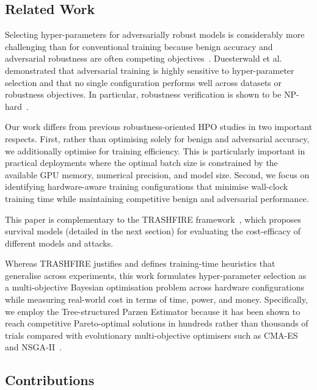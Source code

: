 \documentclass[conference]{IEEEtran}%
\begin{document}
\subsection{Related Work}

Selecting hyper-parameters for adversarially robust models is considerably more challenging than for conventional training because benign accuracy and adversarial robustness are often competing objectives~\cite{carlini_towards_2017,meyers,dohmatob_generalized_2019}. 
Duesterwald et al.~\cite{duesterwald2019} demonstrated that adversarial training is highly sensitive to hyper-parameter selection and that no single configuration performs well across datasets or robustness objectives. 
In particular, robustness verification is shown to be NP-hard~\cite{carlini_towards_2017}.

Our work differs from previous robustness-oriented HPO studies in two important respects. 
First, rather than optimising solely for benign and adversarial accuracy, we additionally optimise for training efficiency. 
This is particularly important in practical deployments where the optimal batch size is constrained by the available GPU memory, numerical precision, and model size. 
Second, we focus on identifying hardware-aware training configurations that minimise wall-clock training time while maintaining competitive benign and adversarial performance.

This paper is complementary to the TRASHFIRE framework~\cite{meyers_aft}, which proposes survival models (detailed in the next section) for evaluating the cost-efficacy of different models and attacks.

Whereas TRASHFIRE justifies and defines training-time heuristics that generalise across experiments, this work formulates hyper-parameter selection as a multi-objective Bayesian optimisation problem across hardware configurations while measuring real-world cost in terms of time, power, and money.
Specifically, we employ the Tree-structured Parzen Estimator because it has been shown to reach competitive Pareto-optimal solutions in hundreds rather than thousands of trials compared with evolutionary multi-objective optimisers such as CMA-ES and NSGA-II~\cite{ozaki2020multiobjective,optuna,tpe_params}.

\subsection{Contributions}
\end{document}
